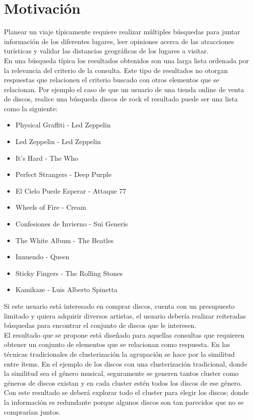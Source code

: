 \section{Motivación}
Planear un viaje típicamente requiere realizar múltiples búsquedas para juntar información de los diferentes lugares, leer opiniones acerca de las atracciones turísticas y validar las distancias geográficas de los lugares a visitar.\\
En una búsqueda típica los resultados obtenidos son una larga lista ordenada por la relevancia del criterio de la consulta. Este tipo de resultados no otorgan respuestas que relacionen el criterio buscado con otros elementos que se relacionan. Por ejemplo el caso de que un usuario de una tienda online de venta de discos, realice una búsqueda discos de rock el resultado puede ser una lista como la siguiente:\\
\begin{itemize}
  \item Physical Graffiti - Led Zeppelin
  \item Led Zeppelin - Led Zeppelin
  \item It's Hard - The Who
  \item Perfect Strangers - Deep Purple
  \item El Cielo Puede Esperar - Attaque 77
  \item Wheels of Fire - Cream
  \item Confesiones de Invierno - Sui Generis
  \item The White Album - The Beatles
  \item Innuendo - Queen
  \item Sticky Fingers - The Rolling Stones
  \item Kamikaze - Luis Alberto Spinetta
\end{itemize}

Si este usuario está interesado en comprar discos, cuenta con un presupuesto limitado y quiera adquirir diversos artistas, el usuario debería realizar reiteradas búsquedas para encontrar el conjunto de discos que le interesen.\\

El resultado que se propone está diseñado para aquellas consultas que requieren obtener un conjunto de elementos que se relacionan como respuesta. En las técnicas tradicionales de clusterización la agrupación se hace por la similitud entre ítems. En el ejemplo de los discos con una clusterización tradicional, donde la similitud sea el género musical, seguramente se generen tantos cluster como géneros de discos existan y en cada cluster estén todos los discos de ese género. Con este resultado se deberá explorar todo el cluster para elegir los discos; donde la información es redundante porque algunos discos son tan parecidos que no se comprarían juntos.\\

